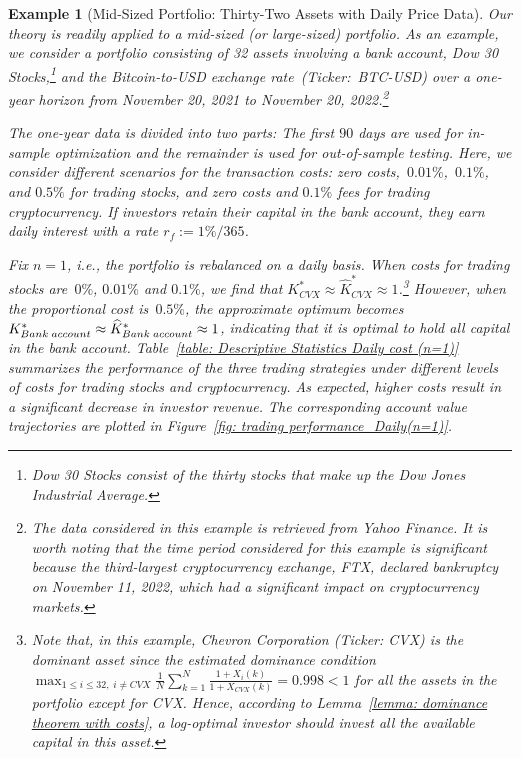 \documentclass[10pt]{article} %
\newtheorem{example}{Example}[section]
\begin{document}
	
	\begin{example}[Mid-Sized Portfolio: Thirty-Two Assets with Daily Price Data] \rm \label{example: Robustness check}
		Our theory is readily applied to a mid-sized (or large-sized) portfolio.
		As an example,  we consider a portfolio consisting of 32 assets involving a bank account, Dow 30 Stocks,\footnote{Dow 30 Stocks consist of the thirty stocks that make up the Dow Jones Industrial Average.} and the Bitcoin-to-USD exchange rate~(Ticker:~BTC-USD) over a one-year horizon from November 20, 2021 to November 20, 2022.\footnote{The data considered in this example is retrieved from Yahoo Finance. It is worth noting that the time period considered for this example is significant because the third-largest cryptocurrency exchange, FTX, declared bankruptcy on November 11, 2022, which had a significant  impact on cryptocurrency markets.} 
		
		The one-year data is divided into two parts: The first $90$ days are used for in-sample optimization and the remainder is used for out-of-sample testing. 
		Here, we consider different scenarios for the transaction costs: zero costs,~$0.01\%$,~$0.1\%$, and $0.5\%$ for  trading stocks, and zero costs and $0.1\%$ fees for trading cryptocurrency. 
		If investors retain their capital in the bank account, they earn daily interest with a rate $r_f :=1\%/365$.
		
		Fix $n=1$, i.e., the portfolio is rebalanced on a daily basis.
		When costs for trading stocks are~$0\%$, $0.01\%$ and $0.1\%$, we find that $K_{CVX}^* \approx \widehat{K}_{CVX}^*  \approx 1$.\footnote{Note that, in this example, Chevron Corporation (Ticker: CVX) is the dominant asset since the estimated dominance condition $\max_{1\leq i \leq 32,\; i \neq CVX} \frac{1}{N}\sum_{k=1}^{N}\frac{1+X_{i}(k)}{1+X_{CVX}(k)} = 0.998 < 1$ for all the assets in the portfolio except for CVX. 
			Hence, according to Lemma~\ref{lemma: dominance theorem with costs}, a log-optimal investor should invest all the available capital in this asset.} 
		However, when the proportional cost is~$0.5\%$, the approximate optimum becomes $K^*_{\rm Bank \; account} \approx \widehat{K}^*_{\rm Bank \; account} \approx 1$, indicating that it is optimal to hold all capital in the bank account.
		Table~\ref{table: Descriptive Statistics Daily cost (n=1)} summarizes the performance of the three trading strategies under different levels of costs for trading stocks and cryptocurrency.  
		As expected, higher costs result in a significant decrease in investor revenue. 
		The corresponding account value trajectories are plotted in Figure~\ref{fig: trading performance_Daily(n=1)}.
		

\end{example}
\end{document}
